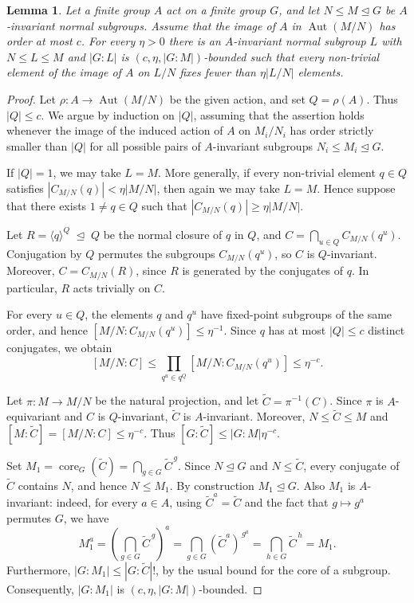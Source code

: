 \documentclass[11pt, oneside]{amsart}
\numberwithin{equation}{section}
\theoremstyle{plain}
\newtheorem{lem}[equation]{Lemma}
\theoremstyle{definition}
\newcommand{\Aut}{\operatorname{Aut} }
\newcommand{\normaleq}{\trianglelefteq}
\begin{document}
\begin{lem}\label{lem:fixed-point-pruning}
Let a finite group $A$ act on a finite group $G$, and let
$N\leqslant M\unlhd G$ be $A$-invariant normal subgroups. Assume that
the image of $A$ in $\Aut(M/N)$ has order at most $c$. For every $\eta>0$
there is an $A$-invariant normal subgroup $L$ with $N\leqslant L\leqslant
M$ and $|G:L|$ is $(c,\eta,|G:M|)$-bounded such that every non-trivial
element of the image of $A$ on $L/N$ fixes fewer than $\eta|L/N|$
elements.
\end{lem}
\begin{proof}
Let $\rho:A\to\Aut(M/N)$ be the given action, and set $Q=\rho(A)$. Thus $|Q|\leqslant c$. We argue by induction on $|Q|$, assuming that the assertion holds whenever the image of the induced action of $A$ on $M_i/N_i$ has order strictly smaller than $|Q|$ for all possible pairs of $A$-invariant subgroups $N_i \leqslant M_i \normaleq G$.

If $|Q|=1$, we may take $L=M$. More generally, if every non-trivial element $q\in Q$ satisfies $|C_{M/N}(q)|<\eta|M/N|$, then again we may take $L=M$. Hence suppose that there exists $1\neq q\in Q$ such that $|C_{M/N}(q)|\geqslant\eta|M/N|$.

Let $R=\langle q\rangle^Q \; \unlhd \; Q$ be the normal closure of $q$ in $Q$, and  $C=\bigcap_{u\in Q}C_{M/N}(q^u)$. Conjugation by $Q$ permutes the subgroups $C_{M/N}(q^u)$, so $C$ is $Q$-invariant. Moreover, $C=C_{M/N}(R)$, since $R$ is generated by the conjugates of $q$. In particular, $R$ acts trivially on $C$.

For every $u\in Q$, the elements $q$ and $q^u$ have fixed-point subgroups of the same order, and hence $[M/N:C_{M/N}(q^u)]\leqslant\eta^{-1}$. Since $q$ has at most $|Q|\leqslant c$ distinct conjugates, we obtain
$$
[M/N:C]
\leqslant
\prod_{q^u\in q^Q}[M/N:C_{M/N}(q^u)]
\leqslant \eta^{-c}.
$$

Let $\pi:M\to M/N$ be the natural projection, and let $\widetilde C=\pi^{-1}(C)$. Since $\pi$ is $A$-equivariant and $C$ is $Q$-invariant, $\widetilde C$ is $A$-invariant. Moreover, $N\leqslant\widetilde C\leqslant M$ and $[M:\widetilde C]=[M/N:C]\leqslant\eta^{-c}$. Thus $[G:\widetilde C]\leqslant |G:M|\eta^{-c}$.

Set $M_1=\operatorname{core}_G(\widetilde C)=\bigcap_{g\in G}\widetilde C^{\,g}$. Since $N\unlhd G$ and $N\leqslant\widetilde C$, every conjugate of $\widetilde C$ contains $N$, and hence $N\leqslant M_1$. By construction $M_1\unlhd G$. Also $M_1$ is $A$-invariant: indeed, for every $a\in A$, using $\widetilde C^a=\widetilde C$ and the fact that $g\mapsto g^a$ permutes $G$, we have
$$
M_1^a
=
\left(\bigcap_{g\in G}\widetilde C^{\,g}\right)^a
=
\bigcap_{g\in G}(\widetilde C^a)^{\,g^a}
=
\bigcap_{h\in G}\widetilde C^{\,h}
=
M_1.
$$
Furthermore, $|G:M_1|\leqslant |G:\widetilde C|!$, by the usual bound for the core of a subgroup. Consequently, $|G:M_1|$ is $(c,\eta,|G:M|)$-bounded.


\end{proof}
\end{document}
